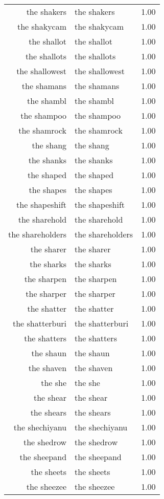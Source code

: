 \begin{table}[ht]
\begin{tabular}{rlr}
  the shakers & the shakers & 1.00 \\ 
  the shakycam & the shakycam & 1.00 \\ 
  the shallot & the shallot & 1.00 \\ 
  the shallots & the shallots & 1.00 \\ 
  the shallowest & the shallowest & 1.00 \\ 
  the shamans & the shamans & 1.00 \\ 
  the shambl & the shambl & 1.00 \\ 
  the shampoo & the shampoo & 1.00 \\ 
  the shamrock & the shamrock & 1.00 \\ 
  the shang & the shang & 1.00 \\ 
  the shanks & the shanks & 1.00 \\ 
  the shaped & the shaped & 1.00 \\ 
  the shapes & the shapes & 1.00 \\ 
  the shapeshift & the shapeshift & 1.00 \\ 
  the sharehold & the sharehold & 1.00 \\ 
  the shareholders & the shareholders & 1.00 \\ 
  the sharer & the sharer & 1.00 \\ 
  the sharks & the sharks & 1.00 \\ 
  the sharpen & the sharpen & 1.00 \\ 
  the sharper & the sharper & 1.00 \\ 
  the shatter & the shatter & 1.00 \\ 
  the shatterburi & the shatterburi & 1.00 \\ 
  the shatters & the shatters & 1.00 \\ 
  the shaun & the shaun & 1.00 \\ 
  the shaven & the shaven & 1.00 \\ 
  the she & the she & 1.00 \\ 
  the shear & the shear & 1.00 \\ 
  the shears & the shears & 1.00 \\ 
  the shechiyanu & the shechiyanu & 1.00 \\ 
  the shedrow & the shedrow & 1.00 \\ 
  the sheepand & the sheepand & 1.00 \\ 
  the sheets & the sheets & 1.00 \\ 
  the sheezee & the sheezee & 1.00 \\ 

\end{tabular}
\end{table}

